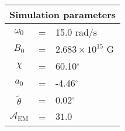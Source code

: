  \begin{tabular}{ccl}
\multicolumn{3}{c}{Simulation parameters} \\
\hline
$\omega_0$  &=& 15.0 rad/s\\
$B_0$  &=& $ 2.683\times 10^{15} $ G \\
$\chi$  &=& 60.10$^{\circ}$ \\
$a_0$ &=& -4.46$^{\circ}$ \\
$\tilde{\theta}$ &= & 0.02$^{\circ}$ \\
$\mathcal{A}_{\mathrm{EM}}$ &= & $31.0$
\end{tabular}
    